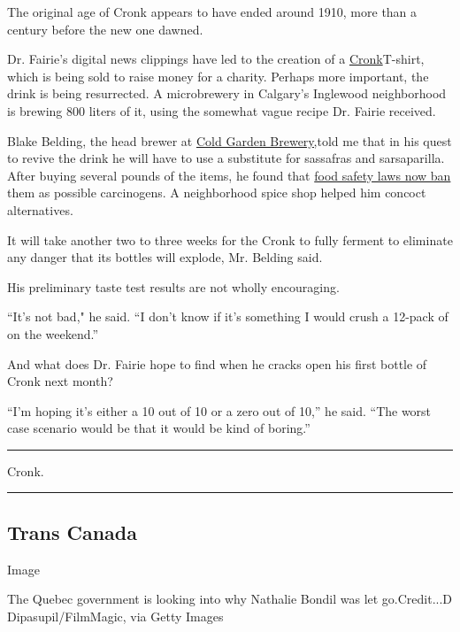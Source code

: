 The original age of Cronk appears to have ended around 1910, more than a
century before the new one dawned.

Dr. Fairie's digital news clippings have led to the creation of a
\href{https://thebigsteak.com/products/cronk-is-good-t-shirt?variant=31874543878259}{Cronk}T-shirt,
which is being sold to raise money for a charity. Perhaps more
important, the drink is being resurrected. A microbrewery in Calgary's
Inglewood neighborhood is brewing 800 liters of it, using the somewhat
vague recipe Dr. Fairie received.

Blake Belding, the head brewer at \href{https://www.coldgarden.ca}{Cold
Garden Brewery,}told me that in his quest to revive the drink he will
have to use a substitute for sassafras and sarsaparilla. After buying
several pounds of the items, he found that
\href{https://www.mcgill.ca/oss/article/did-you-know/root-root-beer-sassafras}{food
safety laws now ban} them as possible carcinogens. A neighborhood spice
shop helped him concoct alternatives.

It will take another two to three weeks for the Cronk to fully ferment
to eliminate any danger that its bottles will explode, Mr. Belding said.

His preliminary taste test results are not wholly encouraging.

``It's not bad," he said. ``I don't know if it's something I would crush
a 12-pack of on the weekend.''

And what does Dr. Fairie hope to find when he cracks open his first
bottle of Cronk next month?

``I'm hoping it's either a 10 out of 10 or a zero out of 10,'' he said.
``The worst case scenario would be that it would be kind of boring.''

\begin{center}\rule{0.5\linewidth}{\linethickness}\end{center}

Cronk.

\begin{center}\rule{0.5\linewidth}{\linethickness}\end{center}

\hypertarget{trans-canada}{%
\subsection{Trans Canada}\label{trans-canada}}

Image

The Quebec government is looking into why Nathalie Bondil was let
go.Credit...D Dipasupil/FilmMagic, via Getty Images

